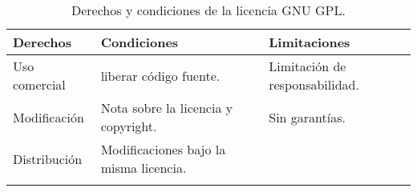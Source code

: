 \begin{longtable}[]{@{}lll@{}}
\toprule
\begin{minipage}[b]{0.20\columnwidth}\raggedright\strut
Derechos\strut
\end{minipage} & \begin{minipage}[b]{0.33\columnwidth}\raggedright\strut
Condiciones\strut
\end{minipage} & \begin{minipage}[b]{0.33\columnwidth}\raggedright\strut
Limitaciones\strut
\end{minipage}\tabularnewline
\midrule
\endhead
\begin{minipage}[t]{0.20\columnwidth}\raggedright\strut
Uso comercial\strut
\end{minipage} & \begin{minipage}[t]{0.33\columnwidth}\raggedright\strut
liberar código fuente.\strut
\end{minipage} & \begin{minipage}[t]{0.33\columnwidth}\raggedright\strut
Limitación de responsabilidad.\strut
\end{minipage}\tabularnewline
\begin{minipage}[t]{0.20\columnwidth}\raggedright\strut
Modificación\strut
\end{minipage} & \begin{minipage}[t]{0.33\columnwidth}\raggedright\strut
Nota sobre la licencia y copyright.\strut
\end{minipage} & \begin{minipage}[t]{0.33\columnwidth}\raggedright\strut
Sin garantías.\strut
\end{minipage}\tabularnewline
\begin{minipage}[t]{0.20\columnwidth}\raggedright\strut
Distribución\strut
\end{minipage} & \begin{minipage}[t]{0.33\columnwidth}\raggedright\strut
Modificaciones bajo la misma licencia.\strut
\end{minipage} & \begin{minipage}[t]{0.33\columnwidth}\raggedright\strut
\strut
\end{minipage}\tabularnewline
\bottomrule
\caption{Derechos y condiciones de la licencia GNU GPL.}
\end{longtable}




